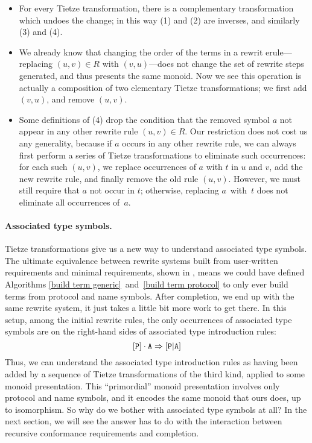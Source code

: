 \documentclass[../generics]{subfiles}
\begin{document}
\begin{itemize}
\item For every Tietze transformation, there is a complementary transformation which undoes the change; in this way (1) and (2) are inverses, and similarly (3) and (4).

\item We already know that changing the order of the terms in a rewrit erule---replacing $(u,v)\in R$ with $(v,u)$---does not change the set of rewrite steps generated, and thus presents the same monoid. Now we see this operation is actually a composition of two elementary Tietze transformations; we first add $(v,u)$, and remove $(u,v)$.

\item Some definitions of (4) drop the condition that the removed symbol $a$ not appear in any other rewrite rule $(u,v)\in R$. Our restriction does not cost us any generality, because if $a$ occurs in any other rewrite rule, we can always first perform a series of Tietze transformations to eliminate such occurrences: for each such $(u,v)$, we replace occurrences of $a$ with $t$ in $u$ and $v$, add the new rewrite rule, and finally remove the old rule $(u,v)$. However, we must still require that $a$ not occur in $t$; otherwise, replacing $a$~with~$t$ does not eliminate all occurrences of~$a$.
\end{itemize}

\paragraph{Associated type symbols.} Tietze transformations give us a new way to understand associated type symbols. The ultimate equivalence between rewrite systems built from user-written requirements and minimal requirements, shown in , means we could have defined Algorithms \ref{build term generic}~and~\ref{build term protocol} to only ever build terms from protocol and name symbols. After completion, we end up with the same rewrite system, it just takes a little bit more work to get there. In this setup, among the initial rewrite rules, the only occurrences of associated type symbols are on the right-hand sides of associated type introduction rules:
\[[\texttt{P}]\cdot\texttt{A}\Rightarrow[\texttt{P}|\texttt{A}]\]
Thus, we can understand the associated type introduction rules as having been added by a sequence of Tietze transformations of the third kind, applied to some monoid presentation. This ``primordial'' monoid presentation involves only protocol and name symbols, and it encodes the same monoid that ours does, up to isomorphism. So why do we bother with associated type symbols at all? In the next section, we will see the answer has to do with the interaction between recursive conformance requirements and completion.
\end{document}
